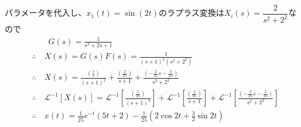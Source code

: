 \documentclass[a4paper,12pt]{article}
\begin{document}
\begin{tcolorbox}[title={6. (7)\(m=1,d=2,k_1=1,k_2=1\)とし、入力変位\(x_1(t)=\sin(2t)\)を与えたときの応
\indent \quad 答を求めよ。 }]
パラメータを代入し、\(x_1(t)=\sin(2t)\)のラプラス変換は\(X_i(s)=\dfrac{2}{s^2+2^2}\)なので
    \vspace{-4mm}
    \begin{align*}
        &\qquad G(s) = \frac{1}{s^2 + 2s+ 1} \\
        &\therefore \quad X(s) = G(s) F(s) = \frac{1}{(s+1)^2(s^2+2^2)} \\
        &\therefore \quad X(s) =  \frac{\left(\frac{1}{5}\right)}{(s+1)^2} 
        + \frac{\left(\frac{2}{25}\right)}{s+1}
        + \frac{\left(-\frac{2}{25}s-\frac{3}{25}\right)}{s^2+2^2}\\
        &\therefore \quad \mathcal{L}^{-1} \left[ X(s)\right] 
        = \mathcal{L}^{-1} \left[\frac{\left(\frac{5}{25}\right)}{(s+1)^2}  \right]
        + \mathcal{L}^{-1} \left[\frac{\left(\frac{2}{25}\right)}{s+1} \right]
        + \mathcal{L}^{-1} \left[\frac{\left(-\frac{2}{25}s-\frac{3}{25}\right)}{s^2+2^2}\right]  \\
        &\therefore \quad x(t) = \frac{1}{25}e^{-t}(5t+2)- \frac{1}{25}\left(2\cos 2t + \frac{3}{2}\sin 2t\right)
    \end{align*}
\end{tcolorbox}
\end{document}
